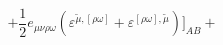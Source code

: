 \begin{equation}
+\frac 12 e_{\mu \nu \rho \omega }\left( \varepsilon
^{\widetilde{\mu },[\rho \omega ]}+\varepsilon ^{[\rho \omega
],\widetilde{\mu }}\right) \biggr ] _{AB}+ \label{17}
\end{equation}

